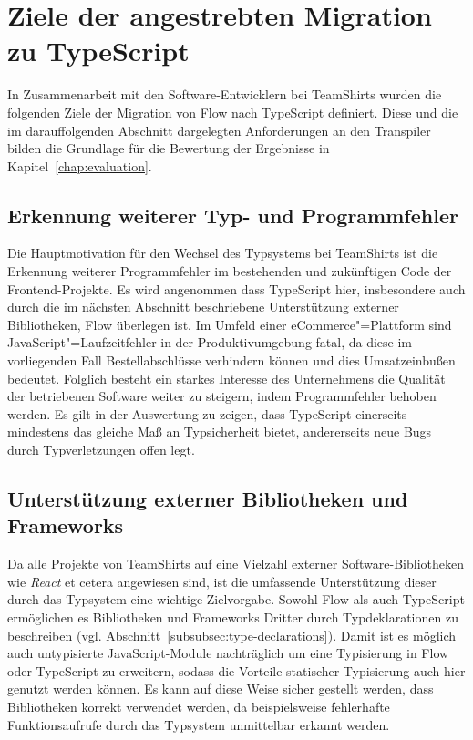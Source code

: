 \section{Ziele der angestrebten Migration zu TypeScript}
\label{analysis:goals}

In Zusammenarbeit mit den Software-Entwicklern bei TeamShirts wurden die folgenden Ziele der Migration von Flow nach TypeScript definiert. Diese und die im darauffolgenden Abschnitt dargelegten Anforderungen an den Transpiler bilden die Grundlage für die Bewertung der Ergebnisse in Kapitel~\ref{chap:evaluation}.

\subsection{Erkennung weiterer Typ- und Programmfehler}

Die Hauptmotivation für den Wechsel des Typsystems bei TeamShirts ist die Erkennung weiterer Programmfehler im bestehenden und zukünftigen Code der Frontend-Projekte. Es wird angenommen dass TypeScript hier, insbesondere auch durch die im nächsten Abschnitt beschriebene Unterstützung externer Bibliotheken, Flow überlegen ist. Im Umfeld einer eCommerce"=Plattform sind JavaScript"=Laufzeitfehler in der Produktivumgebung fatal, da diese im vorliegenden Fall Bestellabschlüsse verhindern können und dies Umsatzeinbußen bedeutet. Folglich besteht ein starkes Interesse des Unternehmens die Qualität der betriebenen Software weiter zu steigern, indem Programmfehler behoben werden. Es gilt in der Auswertung zu zeigen, dass TypeScript einerseits mindestens das gleiche Maß an Typsicherheit bietet, andererseits neue Bugs durch Typverletzungen offen legt.

\subsection{Unterstützung externer Bibliotheken und Frameworks}

Da alle Projekte von TeamShirts auf eine Vielzahl externer Software-Bibliotheken wie \textit{React} et cetera angewiesen sind, ist die umfassende Unterstützung dieser durch das Typsystem eine wichtige Zielvorgabe. Sowohl Flow als auch TypeScript ermöglichen es Bibliotheken und Frameworks Dritter durch Typdeklarationen zu beschreiben (vgl. Abschnitt~\ref{subsubsec:type-declarations}). Damit ist es möglich auch untypisierte JavaScript-Module nachträglich um eine Typisierung in Flow oder TypeScript zu erweitern, sodass die Vorteile statischer Typisierung auch hier genutzt werden können. Es kann auf diese Weise sicher gestellt werden, dass Bibliotheken korrekt verwendet werden, da beispielsweise fehlerhafte Funktionsaufrufe durch das Typsystem unmittelbar erkannt werden.

